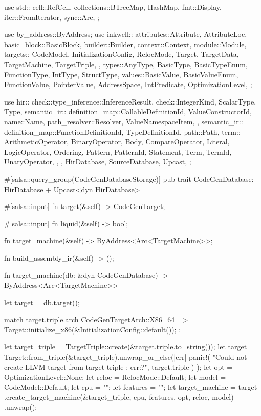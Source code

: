 \documentclass[
  oneside,
  english,
  coorientadorbanca,
  noabntexcite
]{ufsc-thesis-rn46-2019}
\begin{document}
\begin{rustcode}
use std::{
    cell::RefCell,
    collections::{BTreeMap, HashMap},
    fmt::Display,
    iter::FromIterator,
    sync::Arc,
};

use by_address::ByAddress;
use inkwell::{
    attributes::{Attribute, AttributeLoc},
    basic_block::BasicBlock,
    builder::Builder,
    context::Context,
    module::Module,
    targets::{
        CodeModel, InitializationConfig, RelocMode, Target, TargetData, TargetMachine, TargetTriple,
    },
    types::{AnyType, BasicType, BasicTypeEnum, FunctionType, IntType, StructType},
    values::{BasicValue, BasicValueEnum, FunctionValue, PointerValue},
    AddressSpace, IntPredicate, OptimizationLevel,
};

use hir::{
    check::type_inference::InferenceResult,
    check::{IntegerKind, ScalarType, Type},
    semantic_ir::{
        definition_map::{CallableDefinitionId, ValueConstructorId},
        name::Name,
        path_resolver::{Resolver, ValueNamespaceItem},
    },
    semantic_ir::{
        definition_map::{FunctionDefinitionId, TypeDefinitionId},
        path::Path,
        term::{
            ArithmeticOperator, BinaryOperator, Body, CompareOperator, Literal, LogicOperator,
            Ordering, Pattern, PatternId, Statement, Term, TermId, UnaryOperator,
        },
    },
    HirDatabase, SourceDatabase, Upcast,
};

#[salsa::query_group(CodeGenDatabaseStorage)]
pub trait CodeGenDatabase: HirDatabase + Upcast<dyn HirDatabase> {
    #[salsa::input]
    fn target(&self) -> CodeGenTarget;

    #[salsa::input]
    fn liquid(&self) -> bool;

    fn target_machine(&self) -> ByAddress<Arc<TargetMachine>>;

    fn build_assembly_ir(&self) -> ();
}

fn target_machine(db: &dyn CodeGenDatabase) -> ByAddress<Arc<TargetMachine>> {
    let target = db.target();

    match target.triple.arch {
        CodeGenTargetArch::X86_64 => {
            Target::initialize_x86(&InitializationConfig::default());
        }
    };

    let target_triple = TargetTriple::create(&target.triple.to_string());
    let target = Target::from_triple(&target_triple).unwrap_or_else(|err| {
        panic!(
            "Could not create LLVM target from target triple {}: {err:?}",
            target.triple
        )
    });
    let opt = OptimizationLevel::None;
    let reloc = RelocMode::Default;
    let model = CodeModel::Default;
    let cpu = "";
    let features = "";
    let target_machine = target
        .create_target_machine(&target_triple, cpu, features, opt, reloc, model)
        .unwrap();

}
\end{rustcode}
\end{document}
